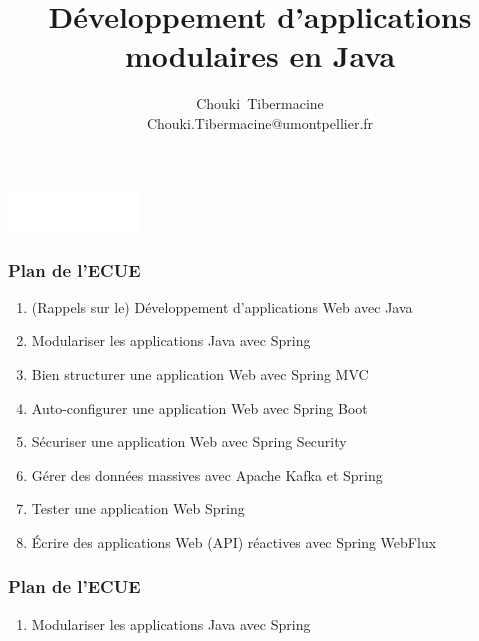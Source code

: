 \documentclass{beamer}
\title[]{\Large{Développement d'applications modulaires en Java}}
\author[C. Tibermacine]{\large{Chouki~Tibermacine}\\
	\small{Chouki.Tibermacine@umontpellier.fr}}
\date{\tiny{}}
\begin{document}
\begin{frame}
\titlepage
\begin{flushright}
\includegraphics[width=3.5cm]{figs/polytech.png}
\end{flushright}
\end{frame}

\begin{frame}
	\frametitle{Plan de l'ECUE}
	\begin{enumerate}
		\item (Rappels sur le) Développement d'applications Web avec Java
		\item Modulariser les applications Java avec Spring
		\item Bien structurer une application Web avec Spring MVC
		\item Auto-configurer une application Web avec Spring Boot
		\item Sécuriser une application Web avec Spring Security
		\item Gérer des données massives avec Apache Kafka et Spring
		\item Tester une application Web Spring
		\item Écrire des applications Web (API) réactives avec Spring WebFlux
	\end{enumerate}
\end{frame}

\begin{frame}
	\frametitle{Plan de l'ECUE}
	\begin{enumerate}
		{\color{gray}{
		\item (Rappels sur le) Développement d'applications Web avec Java}}
				\item Modulariser les applications Java avec Spring
		{\color{gray}{
				\item Bien structurer une application Web avec Spring MVC
				\item Auto-configurer une application Web avec Spring Boot
				\item Sécuriser une application Web avec Spring Security
				\item Gérer des données massives avec Apache Kafka et Spring		
				\item Tester une application Web Spring
				\item Écrire des applications Web (API) réactives avec Spring WebFlux}}
	\end{enumerate}
\end{frame}
\end{document}
